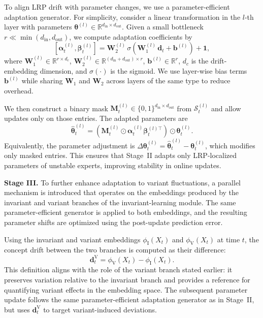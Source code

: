 ﻿\documentclass[journal]{IEEEtran}
\begin{document}
To align LRP drift with parameter changes, we use a parameter-efficient adaptation generator. For simplicity, consider a linear transformation in the $l$-th layer with parameters $\boldsymbol{\theta}^{(l)}\in\mathbb{R}^{d_{\mathrm{in}}\times d_{\mathrm{out}}}$. Given a small bottleneck $r\ll\min(d_{\mathrm{in}},d_{\mathrm{out}})$, we compute adaptation coefficients by
\begin{equation}
\left[{\boldsymbol{\alpha}}^{(l)}_t,{\boldsymbol{\beta}}^{(l)}_t\right]
=\mathbf{W}^{(l)}_2\,\sigma\!\left(\mathbf{W}^{(l)}_1\,\mathbf{d}_t+\mathbf{b}^{(l)}\right)+\mathbf{1},
\end{equation}
where $\mathbf{W}^{(l)}_1\in\mathbb{R}^{r\times d_c}$, $\mathbf{W}^{(l)}_2\in\mathbb{R}^{(d_{\mathrm{in}}+d_{\mathrm{out}})\times r}$, $\mathbf{b}^{(l)}\in\mathbb{R}^{r}$, $d_c$ is the drift-embedding dimension, and $\sigma(\cdot)$ is the sigmoid. We use layer-wise bias terms $\mathbf{b}^{(l)}$ while sharing $\mathbf{W}_1$ and $\mathbf{W}_2$ across layers of the same type to reduce overhead.

We then construct a binary mask $\mathbf{M}_t^{(l)}\in\{0,1\}^{d_{\mathrm{in}}\times d_{\mathrm{out}}}$ from $\mathcal{S}_t^{(l)}$ and allow updates only on those entries. The adapted parameters are
\begin{equation}
\widehat{\boldsymbol{\theta}}^{(l)}_t=\left(\mathbf{M}_t^{(l)}\odot {\boldsymbol{\alpha}}^{(l)}_t {\boldsymbol{\beta}}^{(l)\top}_t\right)\odot \boldsymbol{\theta}_t^{(l)}.
\end{equation}
Equivalently, the parameter adjustment is $\Delta\boldsymbol{\theta}^{(l)}_t=\widehat{\boldsymbol{\theta}}^{(l)}_t-\boldsymbol{\theta}_t^{(l)}$, which modifies only masked entries. This ensures that Stage~II adapts only LRP-localized parameters of unstable experts, improving stability in online updates. 

\textbf{Stage III.} To further enhance adaptation to variant fluctuations, a parallel mechanism is introduced that operates on the embeddings produced by the invariant and variant branches of the invariant-learning module. The same parameter-efficient generator is applied to both embeddings, and the resulting parameter shifts are optimized using the post-update prediction error.

Using the invariant and variant embeddings $\phi_{\mathrm{I}}(X_t)$ and $\phi_{\mathrm{V}}(X_t)$ at time $t$, the concept drift between the two branches is computed as their difference:
\begin{equation}
\mathbf{d}^{\mathrm{V}}_t=\phi_{\mathrm{V}}(X_t)-\phi_{\mathrm{I}}(X_t).
\end{equation}
This definition aligns with the role of the variant branch stated earlier: it preserves variation relative to the invariant branch and provides a reference for quantifying variant effects in the embedding space. The subsequent parameter update follows the same parameter-efficient adaptation generator as in Stage~II, but uses $\mathbf{d}^{\mathrm{V}}_t$ to target variant-induced deviations.
\end{document}
